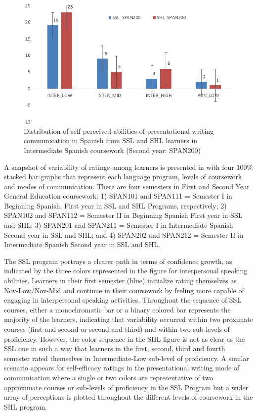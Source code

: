 \documentclass[output=paper]{langscibook}
\begin{document}
\begin{figure}
\caption{Distribution of self-perceived abilities of presentational writing communication in Spanish from SSL and SHL learners in Intermediate Spanish coursework (Second year: SPAN200)}
\label{fig:3:4}
\includegraphics[width=\textwidth]{figures/Figure4-Chapter3.pdf}
\end{figure}




A snapshot of variability of ratings among learners is presented in  with four 100\% stacked bar graphs that represent each language program, levels of coursework and modes of communication. There are four semesters in First and Second Year General Education coursework: 1) SPAN101 and SPAN111 = Semester I in Beginning Spanish, First year in SSL and SHL Programs, respectively; 2) SPAN102 and SPAN112 = Semester II in Beginning Spanish First year in SSL and SHL; 3) SPAN201 and SPAN211 = Semester I in Intermediate Spanish Second year in SSL and SHL; and 4) SPAN202 and SPAN212 = Semester II in Intermediate Spanish Second year in SSL and SHL.

The SSL program portrays a clearer path in terms of confidence growth, as indicated by the three colors represented in the figure for interpersonal speaking abilities. Learners in their first semester (blue) initialize rating themselves as Nov-Low/Nov-Mid and continue in their coursework by feeling more capable of engaging in interpersonal speaking activities. Throughout the sequence of SSL courses, either a monochromatic bar or a binary colored bar represents the majority of the learners, indicating that variability occurred within two proximate courses (first and second or second and third) and within two sub-levels of proficiency. However, the color sequence in the SHL figure is not as clear as the SSL one in such a way that learners in the first, second, third and fourth semester rated themselves in Intermediate-Low sub-level of proficiency. A similar scenario appears for self-efficacy ratings in the presentational writing mode of communication where a single or two colors are representative of two approximate courses or sub-levels of proficiency in the SSL Program but a wider array of perceptions is plotted throughout the different levels of coursework in the SHL program.
\end{document}
